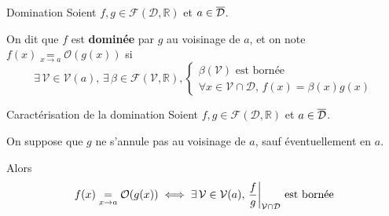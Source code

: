     \begin{defi}{Domination}{}
        Soient $f,g \in \mathcal{F}(\mathcal{D},\mathbb{R})$ et $a \in \overline{\mathcal{D}}$. 
    
        On dit que $f$ est \textbf{dominée} par $g$ au voisinage de $a$, et on note $ f(x) \underset{x \rightarrow a}{=} \mathcal{O}(g(x)) $ si 
        \[ \exists \, \mathcal{V} \in \mathcal{V}(a), \, \exists \, \beta \in \mathcal{F}(\mathcal{V}, \mathbb{R}), \left\{ \begin{array}{ll}
            \beta(\mathcal{V}) \text{ est bornée}  \\
            \forall x \in \mathcal{V} \cap \mathcal{D}, \, f(x) = \beta(x)g(x)
        \end{array} \right. \]
    \end{defi}
        
    \begin{theo}{Caractérisation de la domination}{}
        Soient $f,g \in \mathcal{F}(\mathcal{D},\mathbb{R})$ et $a \in \overline{\mathcal{D}}$.
    
        On suppose que $g$ ne s’annule pas au voisinage de $a$, sauf éventuellement en $a$. 
    
        Alors \[ f(x) \underset{x \rightarrow a}{=} \mathcal{O}(g(x)) \iff \exists \, \mathcal{V} \in \mathcal{V}(a), \,\restr{\frac{f}{g}}{\mathcal{V} \cap \mathcal{D}} \text{ est bornée} \]
    \end{theo}
        
